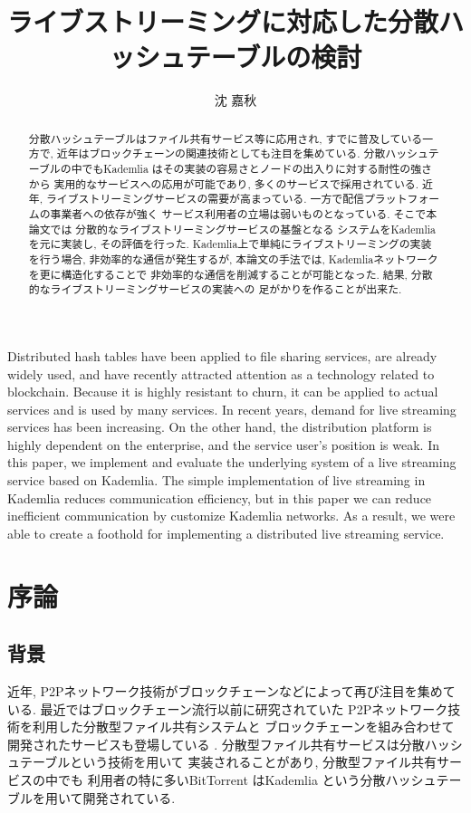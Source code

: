 \documentclass[sotsuron]{jcsie}
\title{ライブストリーミングに対応した分散ハッシュテーブルの検討}
\author{沈 嘉秋}
\begin{document}
\maketitle
\emaketitle
{}
\begin{abstract}    
分散ハッシュテーブルはファイル共有サービス等に応用され, 
すでに普及している一方で, 
近年はブロックチェーンの関連技術としても注目を集めている.
分散ハッシュテーブルの中でもKademlia
はその実装の容易さとノードの出入りに対する耐性の強さから
実用的なサービスへの応用が可能であり, 
多くのサービスで採用されている.
近年, ライブストリーミングサービスの需要が高まっている.
一方で配信プラットフォームの事業者への依存が強く
サービス利用者の立場は弱いものとなっている.
そこで本論文では
分散的なライブストリーミングサービスの基盤となる
システムをKademliaを元に実装し, その評価を行った.
Kademlia上で単純にライブストリーミングの実装を行う場合, 
非効率的な通信が発生するが, 本論文の手法では, 
Kademliaネットワークを更に構造化することで
非効率的な通信を削減することが可能となった.
結果, 分散的なライブストリーミングサービスの実装への
足がかりを作ることが出来た.
\end{abstract}
\begin{eabstract}
Distributed hash tables have been applied to file sharing services, 
are already widely used, and have recently attracted attention as a 
technology related to blockchain.
Because it is highly resistant to churn, it can be applied to actual services 
and is used by many services.
In recent years, demand for live streaming services has been increasing. 
On the other hand, the distribution platform is highly dependent on the enterprise, 
and the service user's position is weak.
In this paper, we implement and evaluate the underlying system 
of a live streaming service based on Kademlia.
The simple implementation of live streaming in 
Kademlia reduces communication efficiency, but in this paper 
we can reduce inefficient communication by customize Kademlia networks.
As a result, we were able to create a foothold for implementing 
a distributed live streaming service.
\end{eabstract}
\setcounter{tocdepth}{2}
\tableofcontents
{}


\chapter{序論}
\section{背景}
\label{sec:haikei}
近年, P2Pネットワーク技術がブロックチェーンなどによって再び注目を集めている.
最近ではブロックチェーン流行以前に研究されていた
P2Pネットワーク技術を利用した分散型ファイル共有システムと
ブロックチェーンを組み合わせて開発されたサービスも登場している
\cite{BitTorre1:online}.
分散型ファイル共有サービスは分散ハッシュテーブルという技術を用いて
実装されることがあり, 分散型ファイル共有サービスの中でも
利用者の特に多いBitTorrent\cite{BitTorre59:online}
はKademlia\cite{maymounkov2002kademlia}\cite{高野祐輝2010nat}
という分散ハッシュテーブルを用いて開発されている.
\end{document}
